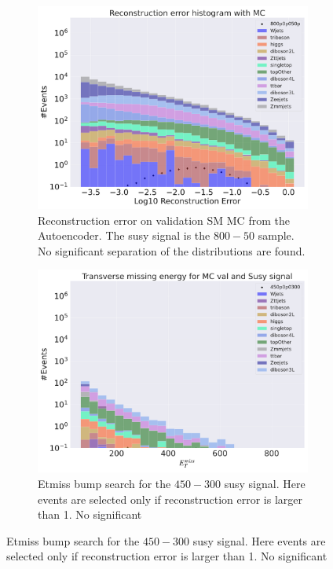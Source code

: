 \begin{figure}[h!]
\begin{subfigure}{.45\textwidth}
        \includegraphics[width=\textwidth]{Figures/AE_testing/small/b_data_recon_big_rm3_feats_sig_800p0p050p.pdf}
        \caption{Reconstruction error on validation SM MC from the Autoencoder. The susy signal is the $800-50$ sample. 
        No significant separation of the distributions are found. }
        \label{fig:ae_susy_800_50_recon}
    \end{subfigure}
    \hfill
    \begin{subfigure}{.45\textwidth}
        \includegraphics[width=\textwidth]{Figures/AE_testing/small/b_data_recon_big_rm3_feats_sig_450p0p0300_etmiss.pdf}
        \caption{Etmiss bump search for the $450-300$ susy signal. Here events are selected only if reconstruction error is larger than 1. No significant 
}
\end{subfigure}
\end{figure}
